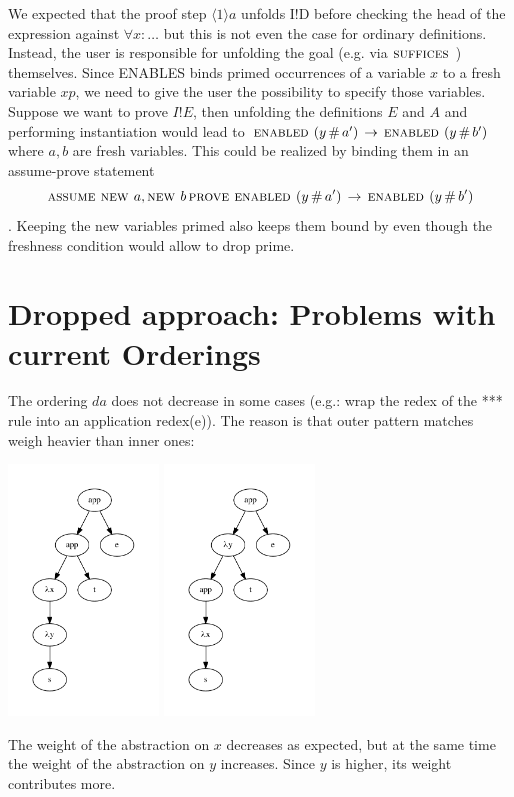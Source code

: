 \documentclass[a4paper]{article}
\newcommand{\tla}[1]{#1}
\newcommand{\impl}[0]{\,\rightarrow\,}
\newcommand{\proofstep}[2]{\langle{#1}\rangle{#2}}
\theoremstyle{definition}
\begin{document}
\begin{itemize}
We expected that the proof step $\tla{\proofstep{1}{a}}$ unfolds \tla{I!D}
 before checking the head of the expression against $\forall x : \ldots$ but
 this is not even the case for ordinary definitions. Instead, the user is
 responsible for unfolding the goal (e.g. via \tla{$\mbox{\sc suffices }$}) themselves.
 Since ENABLES binds primed occurrences of a variable $x$ to a fresh variable
 $xp$, we need to give the user the possibility to specify those variables.
 Suppose we want to prove $\tla{I!E}$, then unfolding the definitions $E$ and
 $A$ and performing instantiation would lead to
 $\tla{\ENABLED (y \dif a') \impl \ENABLED(y \dif b')}$ where $a,b$ are fresh
 variables. This could be realized by binding them in an assume-prove statement
 $$\tla{\ASSUME \NEW a, \NEW b \PROVE \ENABLED (y \dif a') \impl
   \ENABLED(y \dif b')}$$. Keeping the new variables primed also keeps them
 bound by \ENABLED even though the freshness condition would allow to drop
 prime.


\end{itemize}


\section{Dropped approach: Problems with current Orderings}
The ordering $da$ does not decrease in some cases (e.g.: wrap the redex of
  the *** rule into an application redex(e)). The reason is that outer pattern
  matches weigh heavier than inner ones:
  \begin{center}
    \includegraphics[width=4cm]{measure_ce1.pdf}
    \includegraphics[width=4cm]{measure_ce2.pdf}
  \end{center}

The weight of the abstraction on $x$ decreases as expected, but at the same time
the weight of the abstraction on $y$ increases. Since $y$ is higher, its weight
contributes more.
\end{document}
